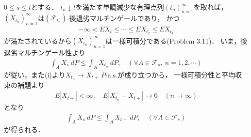	\begin{prf}
		$0 \leq s \leq t$とする．
		$t_n \downarrow t$を満たす単調減少な有理点列$(t_n)_{n=1}^\infty$を取れば，
		$\left( X_{t_n} \right)_{n=1}^\infty$は$(\mathscr{F}_{t_n})$-後退劣マルチンゲールであり，
		かつ
		\begin{align}
			-\infty < EX_t \leq  \cdots \leq EX_{t_2} \leq EX_{t_1}
		\end{align}
		が満たされているから$(X_{t_n})_{n=1}^\infty$は一様可積分である(Problem 3.11)．
		いま，後退劣マルチンゲール性より
		\begin{align}
			\int_A X_s\ dP \leq \int_A X_{t_n}\ dP,
			\quad (\forall A \in \mathscr{F}_s,\ n=1,2,\cdots)
		\end{align}
		が従い，また(i)より$X_{t_n} \longrightarrow X_{t+}\ \mbox{$P$-a.s.}$が成り立つから，
		一様可積分性と平均収束の補題より
		\begin{align}
			E\left| X_{t+} \right| < \infty,
			\quad E \left| X_{t_n} - X_{t+} \right| \longrightarrow 0
			\quad (n \longrightarrow \infty)
			\label{eq:chapter_1_Proposition_3_14_1}
		\end{align}
		となり
		\begin{align}
			\int_A X_s\ dP \leq \int_A X_{t+}\ dP,
			\quad (\forall A \in \mathscr{F}_s)
		\end{align}
		が得られる．
		\QED
	\end{prf}
	
